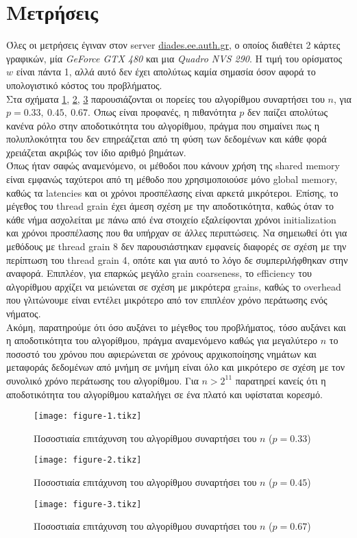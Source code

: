 \documentclass[11pt,a4paper,titlepage]{article}
\newlength\figureheight
\newlength\figurewidth
\begin{document}
\section{Μετρήσεις}
	Όλες οι μετρήσεις έγιναν στον server \url{diades.ee.auth.gr}, ο οποίος διαθέτει 2 κάρτες γραφικών, μία \textit{GeForce GTX 480} και μια \textit{Quadro NVS 290}. Η τιμή του ορίσματος $w$ είναι πάντα 1, αλλά αυτό δεν έχει απολύτως καμία σημασία όσον αφορά το υπολογιστικό κόστος του προβλήματος.\\
	
	Στα σχήματα \ref{fig:p1}, \ref{fig:p2}, \ref{fig:p3} παρουσιάζονται οι πορείες του αλγορίθμου συναρτήσει του $n$, για $p = 0.33,\ 0.45,\ 0.67$. Όπως είναι προφανές, η πιθανότητα $p$ δεν παίζει απολύτως κανένα ρόλο στην αποδοτικότητα του αλγορίθμου, πράγμα που σημαίνει πως η πολυπλοκότητα του δεν επηρεάζεται από τη φύση των δεδομένων και κάθε φορά χρειάζεται ακριβώς τον ίδιο αριθμό βημάτων.\\
	
	Όπως ήταν σαφώς αναμενόμενο, οι μέθοδοι που κάνουν χρήση της shared memory  είναι εμφανώς ταχύτεροι από τη μέθοδο που χρησιμοποιούσε μόνο global memory, καθώς τα latencies και οι χρόνοι προσπέλασης είναι αρκετά μικρότεροι. Επίσης, το μέγεθος του thread grain έχει άμεση σχέση με την αποδοτικότητα, καθώς όταν το κάθε νήμα ασχολείται με πάνω από ένα στοιχείο εξαλείφονται χρόνοι initialization και χρόνοι προσπέλασης που θα υπήρχαν σε άλλες περιπτώσεις. Να σημειωθεί ότι για μεθόδους με thread grain 8 δεν παρουσιάστηκαν εμφανείς διαφορές σε σχέση με την περίπτωση του thread grain 4, οπότε και για αυτό το λόγο δε συμπεριλήφθηκαν στην αναφορά. Επιπλέον, για επαρκώς μεγάλο grain coarseness, το efficiency του αλγορίθμου αρχίζει να μειώνεται σε σχέση με μικρότερα grains, καθώς το overhead που γλιτώνουμε είναι εντέλει μικρότερο από τον επιπλέον χρόνο περάτωσης ενός νήματος.\\
	
	Ακόμη, παρατηρούμε ότι όσο αυξάνει το μέγεθος του προβλήματος, τόσο αυξάνει και η αποδοτικότητα του αλγορίθμου, πράγμα αναμενόμενο καθώς για μεγαλύτερο $n$ το ποσοστό του χρόνου που αφιερώνεται σε χρόνους αρχικοποίησης νημάτων και μεταφοράς δεδομένων από μνήμη σε μνήμη είναι όλο και μικρότερο σε σχέση με τον συνολικό χρόνο περάτωσης του αλγορίθμου. Για $n > 2^{11}$ παρατηρεί κανείς ότι η αποδοτικότητα του αλγορίθμου καταλήγει σε ένα πλατό και υφίσταται κορεσμό.
	

	\setlength\figureheight{5.32cm}
	\setlength\figurewidth{14.7cm}	

	\begin{figure}[h]
		\centering
		\texttt{[image: figure-1.tikz]}
		\caption{Ποσοστιαία επιτάχυνση του αλγορίθμου συναρτήσει του $n$ ($p = 0.33$)}
		\label{fig:p1}
	\end{figure}
	\begin{figure}[h]
		\centering
		\texttt{[image: figure-2.tikz]}
		\caption{Ποσοστιαία επιτάχυνση του αλγορίθμου συναρτήσει του $n$ ($p = 0.45$)}
		\label{fig:p2}
	\end{figure}
	\begin{figure}[h]
		\centering
		\texttt{[image: figure-3.tikz]}
		\caption{Ποσοστιαία επιτάχυνση του αλγορίθμου συναρτήσει του $n$ ($p = 0.67$)}
		\label{fig:p3}
	\end{figure}
\end{document}
